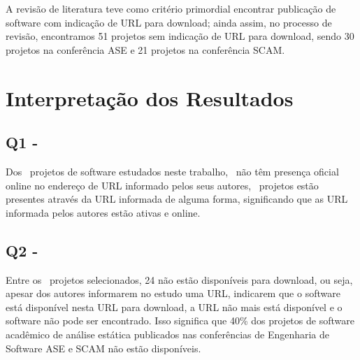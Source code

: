 \begin{description}
A revisão de literatura teve como critério primordial encontrar publicação de
software com indicação de URL para download; ainda assim, no processo de
revisão, encontramos 51 projetos sem indicação de URL para download, sendo 30 projetos
na conferência ASE e 21 projetos na conferência SCAM.



\end{description}


\section{Interpretação dos Resultados} \label{estudo1:interpretacao} %

\subsection{Q1 - \EstudoUmQuestaoUm} %

Dos \SoftwareCount \ projetos de software estudados neste trabalho, \SoftwareUrlNotAvailableCount \ não têm presença
oficial online no endereço de URL informado pelos seus autores, \SoftwareUrlAvailableCount \ projetos
estão presentes através da URL informada de alguma forma, significando que as
URL informada pelos autores estão ativas e online.

\subsection{Q2 - \EstudoUmQuestaoDois} %

Entre os \SoftwareCount \ projetos selecionados, 24 não estão disponíveis para download, ou
seja, apesar dos autores informarem no estudo uma URL, indicarem que o software
está disponível nesta URL para download, a URL não mais está disponível e o
software não pode ser encontrado. Isso significa que 40\% dos projetos de software
acadêmico de análise estática publicados nas conferências de Engenharia de
Software ASE e SCAM não estão disponíveis.

